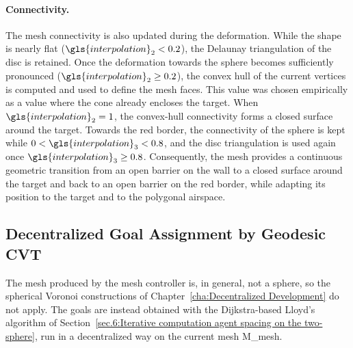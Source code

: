\paragraph{Connectivity.}
The mesh connectivity is also updated during the deformation. While the shape is nearly flat ($\gls{interpolation}_2<0.2$), the Delaunay triangulation of the disc is retained. Once the deformation towards the sphere becomes sufficiently pronounced ($\gls{interpolation}_2 \geq 0.2$), the convex hull of the current vertices is computed and used to define the mesh faces. This value was chosen empirically as a value where the cone already encloses the target. When $\gls{interpolation}_2=1$, the convex-hull connectivity forms a closed surface around the target. Towards the red border, the connectivity of the sphere is kept while $0<\gls{interpolation}_3<0.8$, and the disc triangulation is used again once $\gls{interpolation}_3\ge0.8$. Consequently, the mesh provides a continuous geometric transition from an open barrier on the wall to a closed surface around the target and back to an open barrier on the red border, while adapting its position to the target and to the polygonal airspace.

\subsection{Decentralized Goal Assignment by Geodesic CVT} \label{sec.6:goal_assignment}

The mesh produced by the mesh controller is, in general, not a sphere, so the spherical Voronoi constructions of Chapter~\ref{cha:Decentralized Development} do not apply. The goals are instead obtained with the Dijkstra-based Lloyd's algorithm of Section~\ref{sec.6:Iterative computation agent spacing on the two-sphere}, run in a decentralized way on the current mesh \gls{M_mesh}.

